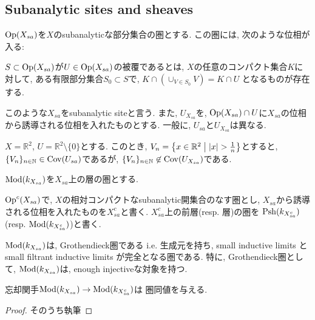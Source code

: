 \documentclass[../main]{subfiles}
\begin{document}
\setcounter{section}{1}
\setcounter{subsection}{2} \addtocounter{subsection}{-1}
\subsection{Subanalytic sites and sheaves}
\begin{dfn}
  $\mathrm{Op}(X_{sa})$を$X$のsubanalyticな部分集合の圏とする.
  この圏には, 次のような位相が入る:

  $S\subset\mathrm{Op}(X_{sa})$が$U\in\mathrm{Op}(X_{sa})$の被覆であるとは,
  $X$の任意のコンパクト集合$K$に対して,
  ある有限部分集合$S_0\subset S$で,
  $K\cap (\cup_{V\in S_0} V) = K\cap U$
  となるものが存在する.

  このような$X_{sa}$をsubanalytic siteと言う.
  また, $U_{X_{sa}}$を,
  $\mathrm{Op}(X_{sa})\cap U$に$X_{sa}$の位相から誘導される位相を入れたものとする.
  一般に, $U_{sa}$と$U_{X_{sa}}$は異なる.
\end{dfn}

\begin{eg}
  $X = \mathbb{R}^2$, $U = \mathbb{R}^2\setminus\{0\}$とする.
  このとき, $V_n = \left\{ x\in\mathbb{R}^2 \relmiddle{|} |x|>\frac{1}{n} \right\}$とすると,
  $\{V_n\}_{n\in\mathbb{N}}\in\mathrm{Cov}(U_{sa})$であるが,
  $\{V_n\}_{n\in\mathbb{N}}\not\in\mathrm{Cov}(U_{X_{sa}})$である.
\end{eg}

\begin{dfn}
  $\mathrm{Mod}(k_{X_{sa}})$を$X_{sa}$上の層の圏とする.
\end{dfn}

\begin{dfn}
  $\mathrm{Op}^c(X_{sa})$で,
  $X$の相対コンパクトなsubanalytic開集合のなす圏とし,
  $X_{sa}$から誘導される位相を入れたものを$X_{sa}^c$と書く.
  $X_{sa}^c$上の前層(resp. 層)の圏を
  $\mathrm{Psh}(k_{X_{sa}^c})$(resp. $\mathrm{Mod}(k_{X_{sa}^c})$)と書く.
\end{dfn}

\begin{prop}
  $\mathrm{Mod}(k_{X_{sa}})$は, Grothendieck圏である
  i.e.
  生成元を持ち,
  small inductive limits と
  small filtrant inductive limits が完全となる圏である.
  特に, Grothendieck圏として,
  $\mathrm{Mod}(k_{X_{sa}})$は, enough injectiveな対象を持つ.
\end{prop}

\begin{prop}
  忘却関手$\mathrm{Mod}(k_{X_{sa}})\to\mathrm{Mod}(k_{X_{sa}^c})$は
  圏同値を与える.
\end{prop}
\begin{proof}
  そのうち執筆
\end{proof}
\end{document}
